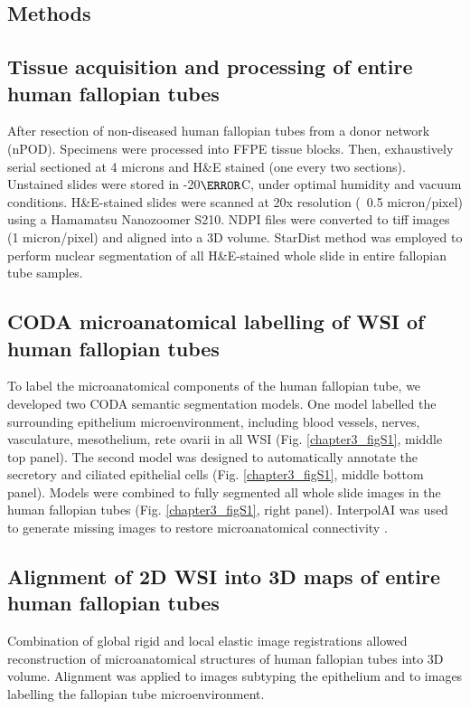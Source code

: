 \begin{refsection}
    \clearpage 
    
    \section{Methods}
    \subsection{Tissue acquisition and processing of entire human fallopian tubes}
    After resection of non-diseased human fallopian tubes from a donor network (nPOD). Specimens were processed into FFPE tissue blocks. Then, exhaustively serial sectioned at 4 microns and H\&E stained (one every two sections). Unstained slides were stored in -20$\degree$C, under optimal humidity and vacuum conditions. 
    H\&E-stained slides were scanned at 20x resolution (~0.5 micron/pixel) using a Hamamatsu Nanozoomer S210. NDPI files were converted to tiff images (1 micron/pixel) and aligned into a 3D volume. StarDist method was employed to perform nuclear segmentation of all H\&E-stained whole slide in entire fallopian tube samples. 
    
    \subsection{CODA microanatomical labelling of WSI of human fallopian tubes}
    To label the microanatomical components of the human fallopian tube, we developed two CODA semantic segmentation models\cite{Kiemen2022CODA,Matos2025CODAvision}. One model labelled the surrounding epithelium microenvironment, including blood vessels, nerves, vasculature, mesothelium, rete ovarii in all WSI (Fig. \ref{chapter3_figS1}, middle top panel). The second model was designed to automatically annotate the secretory and ciliated epithelial cells (Fig. \ref{chapter3_figS1}, middle bottom panel). Models were combined to fully segmented all whole slide images in the human fallopian tubes (Fig. \ref{chapter3_figS1}, right panel). InterpolAI was used to generate missing images to restore microanatomical connectivity \cite{SaurabhInterpolAI}.
    
    \subsection{Alignment of 2D WSI into 3D maps of entire human fallopian tubes}
    Combination of global rigid and local elastic image registrations allowed reconstruction of microanatomical structures of human fallopian tubes into 3D volume\cite{Kiemen2022CODA,Forjaz2025PIVOT}. Alignment was applied to images subtyping the epithelium and to images labelling the fallopian tube microenvironment. 
    

\end{refsection}
